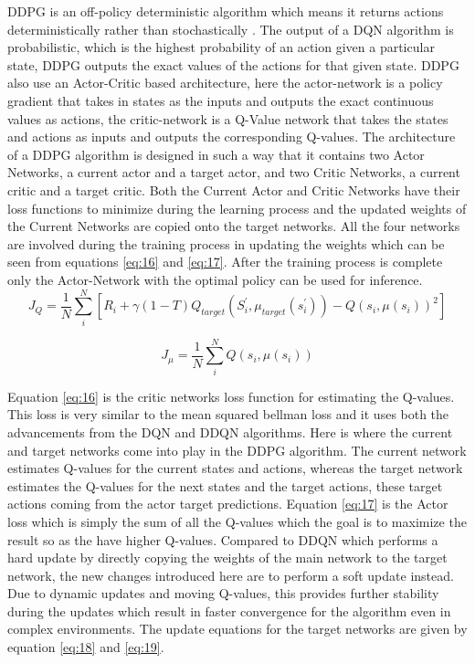 DDPG is an off-policy deterministic algorithm which means it returns actions deterministically rather than stochastically \cite{haarnoja2018soft}. The output of a DQN algorithm is probabilistic, which is the highest probability of an action given a particular state, DDPG outputs the exact values of the actions for that given state. DDPG also use an Actor-Critic based architecture, here the actor-network is a policy gradient that takes in states as the inputs and outputs the exact continuous values as actions, the critic-network is a Q-Value network that takes the states and actions as inputs and outputs the corresponding Q-values. The architecture of a DDPG algorithm is designed in such a way that it contains two Actor Networks, a current actor and a target actor, and two Critic Networks, a current critic and a target critic. Both the Current Actor and Critic Networks have their loss functions to minimize during the learning process and the updated weights of the Current Networks are copied onto the target networks. All the four networks are involved during the training process in updating the weights which can be seen from equations \ref{eq:16} and \ref{eq:17}. After the training process is complete only the Actor-Network with the optimal policy can be used for inference. \\

\begin{equation}\label{eq:16}
    J_{Q} = \frac{1}{N} \sum_{i}^{N} [R_i + \gamma (1 - T) Q_{target} (S_{i}^{'}, \mu_{target} (s_{i}^{'})) - Q (s_i, \mu (s_{i}))^2 ]
\end{equation}

\begin{equation}\label{eq:17}
    J_\mu = \frac{1}{N} \sum_{i}^{N} Q(s_i, \mu(s_i ))
\end{equation}

Equation \ref{eq:16} is the critic networks loss function for estimating the Q-values. This loss is very similar to the mean squared bellman loss and it uses both the advancements from the DQN and DDQN algorithms. Here is where the current and target networks come into play in the DDPG algorithm. The current network estimates Q-values for the current states and actions, whereas the target network estimates the Q-values for the next states and the target actions, these target actions coming from the actor target predictions. Equation \ref{eq:17} is the Actor loss which is simply the sum of all the Q-values which the goal is to maximize the result so as the have higher Q-values. Compared to DDQN which performs a hard update by directly copying the weights of the main network to the target network, the new changes introduced here are to perform a soft update instead. Due to dynamic updates and moving Q-values, this provides further stability during the updates which result in faster convergence for the algorithm even in complex environments. The update equations for the target networks are given by equation \ref{eq:18} and \ref{eq:19}. \\

